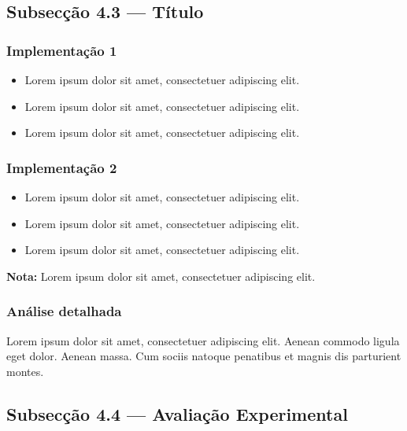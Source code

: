 \documentclass[12pt]{article}
\begin{document}
\subsection{Subsecção 4.3 — Título}
\label{sec:algoritmos}

\subsubsection*{Implementação 1}

\begin{itemize}
    \item Lorem ipsum dolor sit amet, consectetuer adipiscing elit.
    \item Lorem ipsum dolor sit amet, consectetuer adipiscing elit.
    \item Lorem ipsum dolor sit amet, consectetuer adipiscing elit.
\end{itemize}

\subsubsection*{Implementação 2}

\begin{itemize}
    \item Lorem ipsum dolor sit amet, consectetuer adipiscing elit.
    \item Lorem ipsum dolor sit amet, consectetuer adipiscing elit.
    \item Lorem ipsum dolor sit amet, consectetuer adipiscing elit.
\end{itemize}

\textbf{Nota:} Lorem ipsum dolor sit amet, consectetuer adipiscing elit.

\subsubsection*{Análise detalhada}

Lorem ipsum dolor sit amet, consectetuer adipiscing elit. Aenean commodo ligula eget dolor.
Aenean massa. Cum sociis natoque penatibus et magnis dis parturient montes.

\clearpage
\subsection{Subsecção 4.4 — Avaliação Experimental}
\label{sec:experimental}
\end{document}
